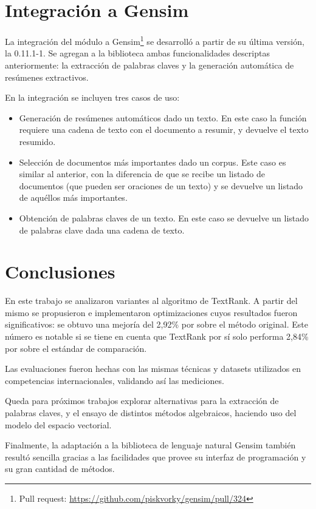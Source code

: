 \documentclass[a4paper]{article}
\begin{document}
\section{Integración a Gensim}
La integración del módulo a Gensim\footnote{Pull request: \url{https://github.com/piskvorky/gensim/pull/324}
} se desarrolló a partir de su última versión, la 0.11.1-1. Se agregan a la biblioteca ambas funcionalidades descriptas anteriormente: la extracción de palabras claves y la generación automática de resúmenes extractivos.

En la integración se incluyen tres casos de uso:
\begin{itemize}
\item Generación de resúmenes automáticos dado un texto. En este caso la función requiere una cadena de texto con el documento a resumir, y devuelve el texto resumido. 
\item Selección de documentos más importantes dado un corpus. Este caso es similar al anterior, con la diferencia de que se recibe un listado de documentos (que pueden ser oraciones de un texto) y se devuelve un listado de aquéllos más importantes.
\item Obtención de palabras claves de un texto. En este caso se devuelve un listado de palabras clave dada una cadena de texto.
\end{itemize}


\section{Conclusiones}
En este trabajo se analizaron variantes al algoritmo de TextRank. A partir del mismo se propusieron e implementaron optimizaciones cuyos resultados fueron significativos: se obtuvo una mejoría del 2,92\% por sobre el método original. Este número es notable si se tiene en cuenta que TextRank por sí solo performa 2,84\% por sobre el estándar de comparación.

Las evaluaciones fueron hechas con las mismas técnicas y datasets utilizados en competencias internacionales, validando así las mediciones.

Queda para próximos trabajos explorar alternativas para la extracción de palabras claves, y el ensayo de distintos métodos algebraicos, haciendo uso del modelo del espacio vectorial.

Finalmente, la adaptación a la biblioteca de lenguaje natural Gensim también resultó sencilla gracias a las facilidades que provee su interfaz de programación y su gran cantidad de métodos.
\end{document}
